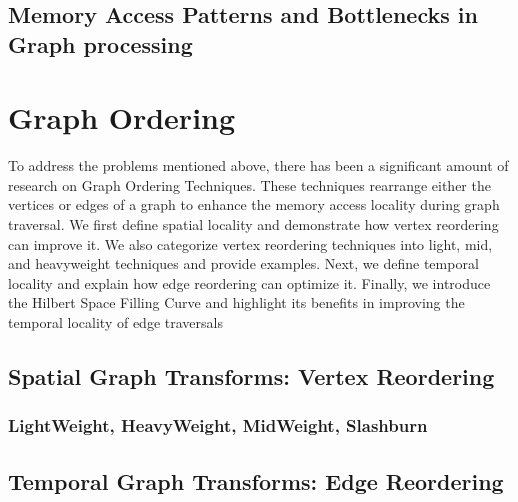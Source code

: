 \subsection{Memory Access Patterns and Bottlenecks in Graph processing}

\section{Graph Ordering}

To address the problems mentioned above, there has been a significant amount of research on Graph Ordering Techniques. These techniques rearrange either the vertices or edges of a graph to enhance the memory access locality during graph traversal. We first define spatial locality and demonstrate how vertex reordering can improve it. We also categorize vertex reordering techniques into light, mid, and heavyweight techniques and provide examples. Next, we define temporal locality and explain how edge reordering can optimize it. Finally, we introduce the Hilbert Space Filling Curve and highlight its benefits in improving the temporal locality of edge traversals

\subsection{Spatial Graph Transforms: Vertex Reordering}
\subsubsection{LightWeight, HeavyWeight, MidWeight, Slashburn}
\subsection{Temporal Graph Transforms: Edge Reordering}

